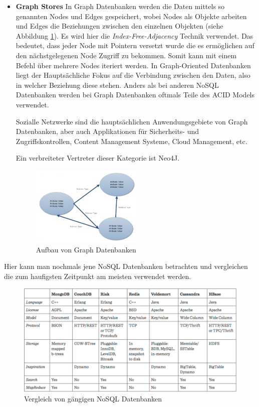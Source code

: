 \begin{itemize}
	\clearpage

	\item \textbf{Graph Stores\newline}
	In Graph Datenbanken werden die Daten mittels so genannten Nodes und Edges gespeichert, wobei Nodes als Objekte arbeiten und Edges die Beziehungen zwischen den einzelnen Objekten (siehe Abbildung \ref{fig:graphdb}). Es wird hier die \textit{Index-Free-Adjacency} Technik verwendet. Das bedeutet, dass jeder Node mit Pointern versetzt wurde die es ermöglichen auf den nächstgelegenen Node Zugriff zu bekommen. Somit kann mit einem Befehl über mehrere Nodes iteriert werden. In Graph-Oriented Datenbanken liegt der Hauptsächliche Fokus auf die Verbindung zwischen den Daten, also in welcher Beziehung diese stehen. Anders als bei anderen NoSQL Datenbanken werden bei Graph Datenbanken oftmals Teile des ACID Models verwendet.

	Sozialle Netzwerke sind die hauptsächlichen Anwendungsgebiete von Graph Datenbanken, aber auch Applikationen für Sicherheits- und Zugriffskontrollen, Content Management Systeme, Cloud Management, etc. 

	Ein verbreiteter Vertreter dieser Kategorie ist Neo4J.

	\begin{figure}[h]\centering
		\includegraphics[width=0.5\textwidth]{images/graphStore}
		\caption{Aufbau von Graph Datenbanken}
		\label{fig:graphdb}
	\end{figure}
\end{itemize}
\clearpage

Hier kann man nochmals jene NoSQL Datenbanken betrachten und vergleichen die zum haufigsten Zeitpunkt am meisten verwendet werden.

\begin{figure}[!htb]\centering
	\includegraphics[width=1\textwidth]{images/noSQLComp}
	\caption{Vergleich von gängigen NoSQL Datenbanken\cite{MELD.CH2-dbms.compNoSQL}}
\end{figure}


\clearpage %